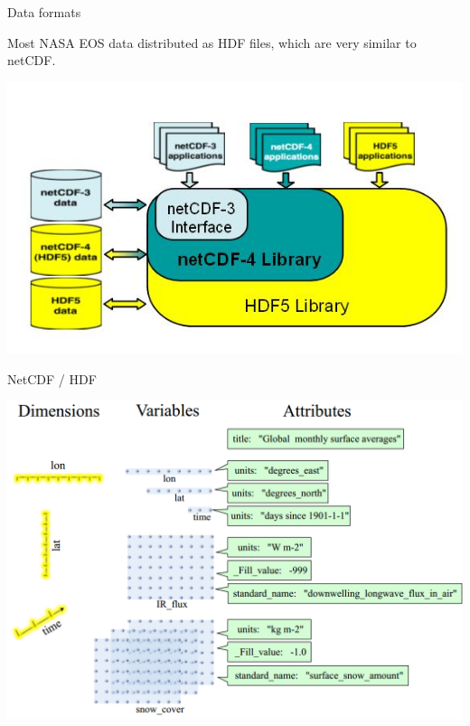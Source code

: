 \documentclass[ignorenonframetext,]{beamer}
\begin{document}
\begin{frame}{Data formats}

Most NASA EOS data distributed as HDF files, which are very similar to
netCDF.

\includegraphics{assets/NETCDF4Library.jpg}

\end{frame}

\begin{frame}{NetCDF / HDF}

\includegraphics{assets/netcdf2.png}

\end{frame}
\end{document}
